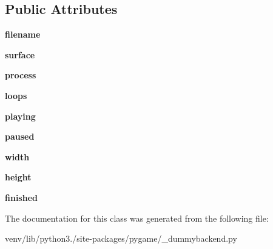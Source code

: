 \subsection*{Public Attributes}
\begin{DoxyCompactItemize}
\item 
\mbox{\label{classpygame_1_1__dummybackend_1_1_movie_a9e2a3a0bed7692ec2d311c2cd67f666b}} 
{\bfseries filename}
\item 
\mbox{\label{classpygame_1_1__dummybackend_1_1_movie_a3920813202ff638e1c735d579500aca5}} 
{\bfseries surface}
\item 
\mbox{\label{classpygame_1_1__dummybackend_1_1_movie_a678e802a154e17b9e558ef7db1746dc4}} 
{\bfseries process}
\item 
\mbox{\label{classpygame_1_1__dummybackend_1_1_movie_abb75ab228d4feb5b3052bd3878644a0f}} 
{\bfseries loops}
\item 
\mbox{\label{classpygame_1_1__dummybackend_1_1_movie_aa751ffe054b2632e0ba787c6e9b96226}} 
{\bfseries playing}
\item 
\mbox{\label{classpygame_1_1__dummybackend_1_1_movie_afae7a6a90c7ed6e42b6bee7f902ec2d1}} 
{\bfseries paused}
\item 
\mbox{\label{classpygame_1_1__dummybackend_1_1_movie_a84c68975436825c5014103d4c8335c29}} 
{\bfseries width}
\item 
\mbox{\label{classpygame_1_1__dummybackend_1_1_movie_a50862e471aa251750a2c9184de034cba}} 
{\bfseries height}
\item 
\mbox{\label{classpygame_1_1__dummybackend_1_1_movie_a115246c460adb05aae79081ad0a15d83}} 
{\bfseries finished}
\end{DoxyCompactItemize}


The documentation for this class was generated from the following file\+:\begin{DoxyCompactItemize}
\item 
venv/lib/python3./site-\/packages/pygame/\+\_\+dummybackend.\+py\end{DoxyCompactItemize}
